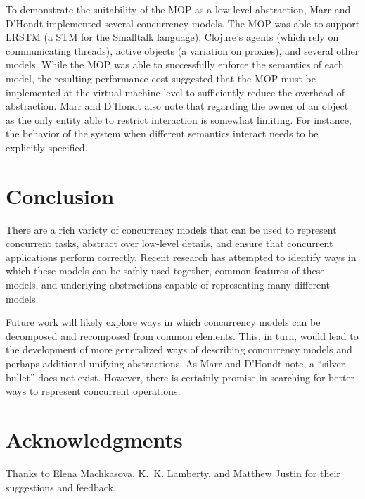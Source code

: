 \documentclass{sig-alternate}
\begin{document}
To demonstrate the suitability of the MOP as a low-level abstraction, Marr and D'Hondt implemented several concurrency models. The MOP was able to support LRSTM (a STM for the Smalltalk language), Clojure's agents (which rely on communicating threads), active objects (a variation on proxies), and several other models. While the MOP was able to successfully enforce the semantics of each model, the resulting performance cost suggested that the MOP must be implemented at the virtual machine level to sufficiently reduce the overhead of abstraction. Marr and D'Hondt also note that regarding the owner of an object as the only entity able to restrict interaction is somewhat limiting. For instance, the behavior of the system when different semantics interact needs to be explicitly specified.

\section{Conclusion}

There are a rich variety of concurrency models that can be used to represent concurrent tasks, abstract over low-level details, and ensure that concurrent applications perform correctly. Recent research has attempted to identify ways in which these models can be safely used together, common features of these models, and underlying abstractions capable of representing many different models.

Future work will likely explore ways in which concurrency models can be decomposed and recomposed from common elements. This, in turn, would lead to the development of more generalized ways of describing concurrency models and perhaps additional unifying abstractions. As Marr and D'Hondt note, a ``silver bullet'' does not exist. However, there is certainly promise in searching for better ways to represent concurrent operations.

\section*{Acknowledgments}

Thanks to Elena Machkasova, K.~K. Lamberty, and Matthew Justin for their suggestions and feedback.

\printbibliography{}
\end{document}

